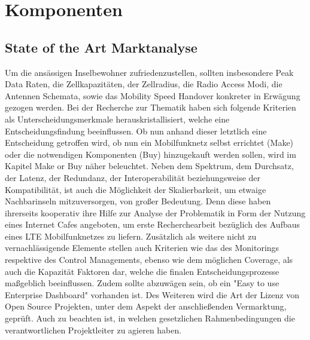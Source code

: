 
%
%
% 
% 
% 


\section{Komponenten}
\label{sec:Komponenten}

\subsection{State of the Art Marktanalyse}
\label{subsec:Marktanalyse}

Um die ansässigen Inselbewohner zufriedenzustellen, sollten insbesondere Peak Data Raten, die Zellkapazitäten, der Zellradius, die Radio Access Modi, die Antennen Schemata, sowie das Mobility Speed Handover konkreter in Erwägung gezogen werden\cite{Dat14}.
Bei der Recherche zur Thematik haben sich folgende Kriterien als Unterscheidungsmerkmale herauskristallisiert, welche eine Entscheidungsfindung beeinflussen. Ob nun anhand dieser letztlich eine Entscheidung getroffen wird, ob nun ein Mobilfunknetz selbst errichtet (Make) oder die notwendigen Komponenten (Buy) hinzugekauft werden sollen, wird im Kapitel Make or Buy näher beleuchtet. Neben dem Spektrum, dem Durchsatz, der Latenz, der Redundanz, der Interoperabilität beziehungsweise der Kompatibilität, ist auch die Möglichkeit der Skalierbarkeit, um etwaige Nachbarinseln mitzuversorgen, von großer Bedeutung. Denn diese haben ihrerseits kooperativ ihre Hilfe zur Analyse der Problematik in Form der Nutzung eines Internet Cafes angeboten, um erste Recherchearbeit bezüglich des Aufbaus eines LTE Mobilfunknetzes zu liefern. Zusätzlich  als weitere nicht zu vernachlässigende Elemente stellen auch Kriterien wie das des Monitorings respektive des Control Managements, ebenso wie dem möglichen Coverage, als auch die Kapazität Faktoren dar, welche die finalen Entscheidungsprozesse maßgeblich beeinflussen. Zudem sollte abzuwägen sein, ob ein "Easy to use Enterprise Dashboard" vorhanden ist. Des Weiteren wird die Art der Lizenz von Open Source Projekten, unter dem Aspekt der anschließenden Vermarktung, geprüft. Auch zu beachten ist, in welchen gesetzlichen Rahmenbedingungen die verantwortlichen Projektleiter zu agieren haben.

